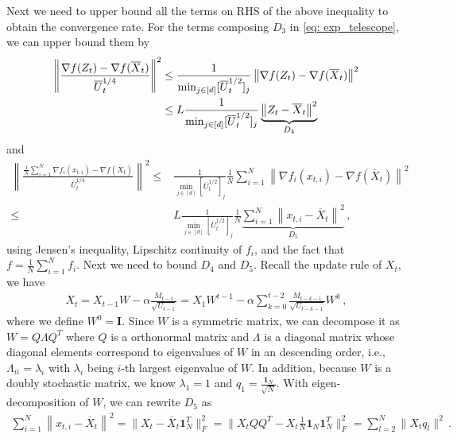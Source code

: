 \documentclass[11pt]{article}
\begin{document}
Next we need to upper bound all the terms on RHS of the above inequality to obtain the convergence rate.
For the terms composing $D_3$ in \eqref{eq: exp_telescope}, we can upper bound them by
\begin{align}\notag
\left\| \frac{\nabla f( Z_{t}) -  \nabla f( \overline X_{t})}{\overline U_{t}^{1/4}}\right\|^2 & \leq \frac{1}{\min_{j \in [d]}[\overline U_{t}^{1/2}]_j}\left\| \nabla f( Z_{t}) -  \nabla f( \overline X_{t})\right\|^2  \\
& \leq   L \frac{1}{\min_{j \in [d]}[\overline U_{t}^{1/2}]_j} \underbrace{\left\|  Z_{t} -  \overline X_{t}\right\|^2}_{D_4} 
\end{align}
and 
\begin{align}\label{eq: T_3_bound_first}
\left\| \frac{\frac{1}{N}\sum_{i=1}^N \nabla f_i( x_{t,i}) -  \nabla f( \overline X_{t})}{\overline U_{t}^{1/4}}  \right\|^2 
\leq & \frac{1}{\min_{j \in [d]}[\overline U_{t}^{1/2}]_j}  \frac{1}{N} \sum_{i=1}^N\left\| { \nabla f_i( x_{t,i}) -  \nabla f( \overline X_{t})}  \right\|^2 \nonumber \\
\leq & L  \frac{1}{\min_{j \in [d]}[\overline U_{t}^{1/2}]_j}  \frac{1}{N} \underbrace{\sum_{i=1}^N\left\| {  x_{t,i} -   \overline X_{t}}  \right\|^2}_{D_5} \, ,
\end{align}
using Jensen's inequality, Lipschitz continuity of $f_i$, and the fact that $f = \frac{1}{N}\sum_{i=1}^N {f_i}$. 
Next we need to bound $D_4$ and $D_5$.
Recall the update rule of $X_t$, we have
\begin{align} \label{eq: update_X}
X_t = X_{t-1} W - \alpha  \frac{M_{t-1}}{\sqrt{U_{t-1}}} = X_{1} W^{t-1} -\alpha \sum_{k=0}^{t-2} \frac{M_{t-k-1}}{\sqrt{U_{t-k-1}}}  W^{k}  \, ,
\end{align}
where we define $W^0 = \mathbf I$.
Since $W$ is a symmetric matrix, we can decompose it as $W = Q \Lambda Q^T$ where $Q$ is a orthonormal matrix and $\Lambda$ is a diagonal matrix whose diagonal elements correspond to eigenvalues of $W$ in an descending order, i.e., $\Lambda_{ii} = \lambda_i$ with $\lambda_i$ being $i$-th largest eigenvalue of $W$. In addition, because $W$ is a doubly stochastic matrix, we know $\lambda_{1} = 1$ and $q_1 = \frac{\mathbf 1_N}{\sqrt{N}}$.
With eigen-decomposition of $W$, we can rewrite $D_5$ as 
\begin{align}\label{eq: t2_matrix}
\sum_{i=1}^N\left\| {  x_{t,i} -   \overline X_{t}}  \right\|^2 =  \|X_t - \overline X_t \mathbf 1^T_N\|_F^2 =  \|X_tQ Q^T -  X_t \frac{1}{N} \mathbf 1_N \mathbf 1^T_N\|_F^2  = \sum_{l=2}^N \|X_t q_l\|^2  \, .
\end{align}
\end{document}
